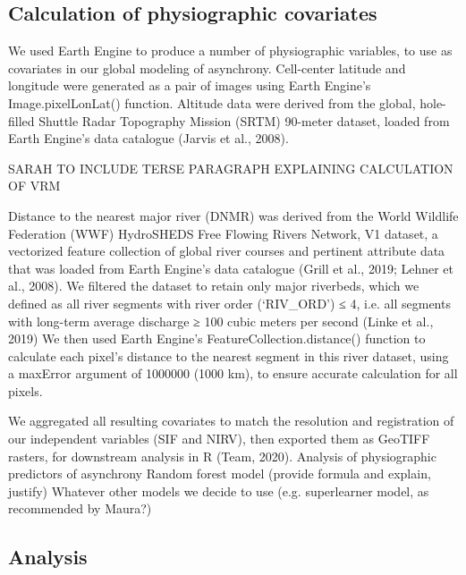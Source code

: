 \documentclass[9pt,twocolumn,twoside,lineno]{pnas-new}
\begin{document}
{\subsection*{Calculation of physiographic covariates}
We used Earth Engine to produce a number of physiographic variables, to
use as covariates in our global modeling of asynchrony. Cell-center
latitude and longitude were generated as a pair of images using Earth
Engine’s Image.pixelLonLat() function. Altitude data were derived from
the global, hole-filled Shuttle Radar Topography Mission (SRTM) 90-meter
dataset, loaded from Earth Engine’s data catalogue (Jarvis et al., 2008).


SARAH TO INCLUDE TERSE PARAGRAPH EXPLAINING CALCULATION OF VRM

Distance to the nearest major river (DNMR) was derived from the World
Wildlife Federation (WWF) HydroSHEDS Free Flowing Rivers Network, V1
dataset, a vectorized feature collection of global river courses and
pertinent attribute data that was loaded from Earth Engine’s data
catalogue (Grill et al., 2019; Lehner et al., 2008). We filtered the
dataset to retain only major riverbeds, which we defined as all river
segments with river order (‘RIV_ORD’) ≤ 4, i.e. all segments with
long-term average discharge ≥ 100 cubic meters per second (Linke et al.,
2019) We then used Earth Engine’s FeatureCollection.distance() function
to calculate each pixel’s distance to the nearest segment in this river
dataset, using a maxError argument of 1000000 (1000 km), to ensure
accurate calculation for all pixels.

We aggregated all resulting covariates to match the resolution and
registration of our independent variables (SIF and NIRV), then exported
them as GeoTIFF rasters, for downstream analysis in R (Team, 2020).
Analysis of physiographic predictors of asynchrony
Random forest model (provide formula and explain, justify)
Whatever other models we decide to use (e.g. superlearner model, as
recommended by Maura?)


\subsection*{Analysis}

}
\end{document}
